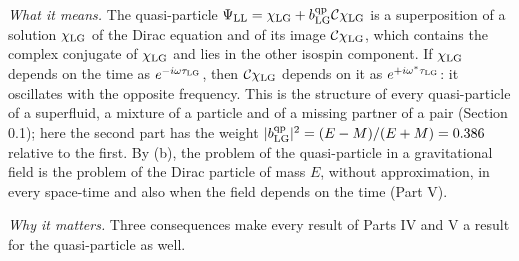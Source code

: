 \documentclass[
  10pt,
]{article}
\begin{document}
\emph{What it means.} The quasi-particle
\(\Psi_{\rm LL}=\chi_{\rm LG}+b^{\rm qp}_{\rm LG}\mathcal C\chi_{\rm LG}\)
is a superposition of a solution \(\chi_{\rm LG}\) of the Dirac equation
and of its image \(\mathcal C\chi_{\rm LG}\), which contains the complex
conjugate of \(\chi_{\rm LG}\) and lies in the other isospin component.
If \(\chi_{\rm LG}\) depends on the time as
\(e^{-i\omega\tau_{\rm LG}}\), then \(\mathcal C\chi_{\rm LG}\) depends
on it as \(e^{+i\omega^*\tau_{\rm LG}}\): it oscillates with the
opposite frequency. This is the structure of every quasi-particle of a
superfluid, a mixture of a particle and of a missing partner of a pair
(Section 0.1); here the second part has the weight
\(\lvert b^{\rm qp}_{\rm LG}\rvert^2=(E-M)/(E+M)=0.386\) relative to the
first. By (b), the problem of the quasi-particle in a gravitational
field is the problem of the Dirac particle of mass \(E\), without
approximation, in every space-time and also when the field depends on
the time (Part V).

\emph{Why it matters.} Three consequences make every result of Parts IV
and V a result for the quasi-particle as well.
\end{document}
